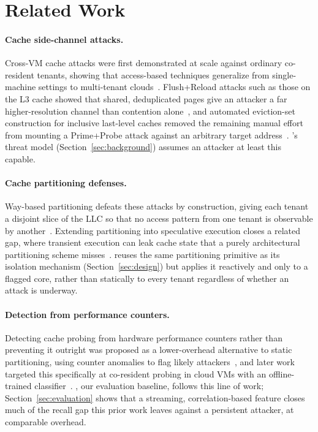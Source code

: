 \section{Related Work}
\label{sec:related}

\paragraph{Cache side-channel attacks.} Cross-VM cache attacks were first demonstrated at
scale against ordinary co-resident tenants, showing that access-based techniques generalize
from single-machine settings to multi-tenant clouds~\cite{okonkwo2015cache}. Flush+Reload
attacks such as those on the L3 cache showed that shared, deduplicated pages give an attacker
a far higher-resolution channel than contention alone~\cite{laurent2014flushreload}, and
automated eviction-set construction for inclusive last-level caches removed the remaining
manual effort from mounting a Prime+Probe attack against an arbitrary target
address~\cite{tanaka2017templates}. \sysname's threat model (Section~\ref{sec:background})
assumes an attacker at least this capable.

\paragraph{Cache partitioning defenses.} Way-based partitioning defeats these attacks by
construction, giving each tenant a disjoint slice of the LLC so that no access pattern from
one tenant is observable by another~\cite{moreau2016catalyst}. Extending partitioning into
speculative execution closes a related gap, where transient execution can leak cache state
that a purely architectural partitioning scheme misses~\cite{delacroix2019dawg}. \sysname{}
reuses the same partitioning primitive as its isolation mechanism (Section~\ref{sec:design})
but applies it reactively and only to a flagged core, rather than statically to every tenant
regardless of whether an attack is underway.

\paragraph{Detection from performance counters.} Detecting cache probing from hardware
performance counters rather than preventing it outright was proposed as a lower-overhead
alternative to static partitioning, using counter anomalies to flag likely
attackers~\cite{herrera2018counterspy}, and later work targeted this specifically at
co-resident probing in cloud VMs with an offline-trained classifier~\cite{weiss2020hpcguard}.
\baseline{}, our evaluation baseline, follows this line of work; Section~\ref{sec:evaluation}
shows that a streaming, correlation-based feature closes much of the recall gap this prior
work leaves against a persistent attacker, at comparable overhead.

